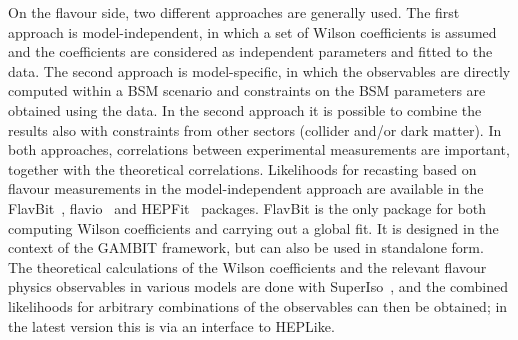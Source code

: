 \documentclass[a4paper,aps,prd,longbibliography,notitlepage,showpacs,amsmath,amssymb,superscriptaddress,nofootinbib,floatfix,11pt,preprintnumbers]{revtex4-1-mod}
\newcommand{\gambit}{\textsf{GAMBIT}\xspace}
\newcommand{\hepfit}{\textsf{HEPFit}\xspace}
\newcommand{\heplike}{\textsf{HEPLike}\xspace}
\begin{document}
On the flavour side, two different approaches are generally used. The first approach is model-independent, in which a set of Wilson coefficients is assumed and the coefficients are considered as independent parameters and fitted to the data. The second approach is model-specific, in which the observables are directly computed within a BSM scenario and constraints on the BSM parameters are obtained using the data. In the second approach it is possible to combine the results also with constraints from other sectors (collider and/or dark matter).
In both approaches, correlations between experimental measurements are important, together with the theoretical correlations.
Likelihoods for recasting based on flavour measurements in the model-independent approach are available in the \textsf{FlavBit}~\cite{Workgroup:2017myk}, \textsf{flavio}~\cite{Straub:2018kue} and \hepfit~\cite{deBlas:2019okz} packages. \textsf{FlavBit} is the only package for both computing Wilson coefficients and carrying out a global fit. It is designed in the context of the \gambit framework, but can also be used in standalone form. The theoretical calculations of the Wilson coefficients and the relevant flavour physics observables in various models are done with \textsf{SuperIso}~\cite{Mahmoudi:2007vz,Mahmoudi:2008tp,Mahmoudi:2009zz}, and the combined likelihoods for arbitrary combinations of the observables can then be obtained; in the latest version \cite{Bhom:2020lmk} this is via an interface to \heplike \cite{Bhom:2020bfe}.
\end{document}

